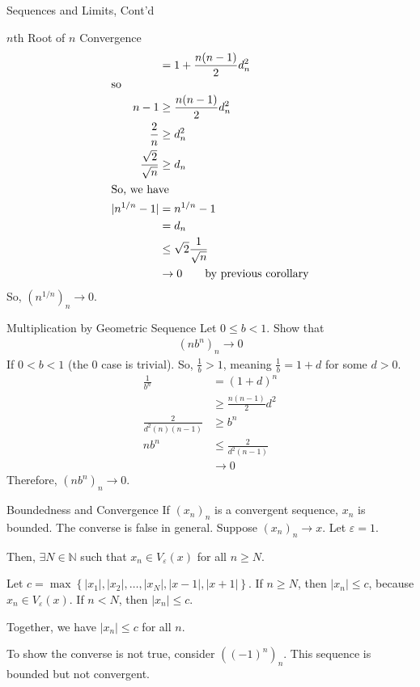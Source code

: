 \documentclass[8pt]{extarticle}
\newcommand{\N}{\mathbb{N}}
\begin{document}
\begin{problem}{Sequences and Limits, Cont'd}
\begin{problem}{$n$th Root of $n$ Convergence}
\begin{align*}
          &= 1 + \frac{n(n-1)}{2}d_n^2\\
          \shortintertext{so}
        n-1 &\geq \frac{n(n-1)}{2}d_n^2\\
        \frac{2}{n} &\geq d_n^2\\
        \frac{\sqrt{2}}{\sqrt{n}} &\geq d_n\\
        \shortintertext{So, we have}
        |n^{1/n} - 1| &= n^{1/n} - 1\\
                      &= d_n\\
                      &\leq \sqrt{2} \frac{1}{\sqrt{n}}\\
                      &\rightarrow 0 \tag*{by previous corollary}
      \end{align*}
      So, $\left(n^{1/n}\right)_n \rightarrow 0$.
    \end{problem}
    \begin{problem}{Multiplication by Geometric Sequence}
      Let $0 \leq b < 1$. Show that
      \begin{align*}
        \left(nb^n\right)_n \rightarrow 0
      \end{align*}
      \tcblower
      If $0 < b < 1$ (the $0$ case is trivial). So, $\frac{1}{b} > 1$, meaning $\frac{1}{b} = 1 + d$ for some $d > 0$.
      \begin{align*}
        \frac{1}{b^n} &= (1 + d)^n\\
                      &\geq \frac{n(n-1)}{2}d^2\\
        \frac{2}{d^2(n)(n-1)} &\geq b^n\\
        nb^n &\leq \frac{2}{d^2(n-1)}\\
             &\rightarrow 0 \tag*{by previous corollary}
      \end{align*}
      Therefore, $(nb^n)_n \rightarrow 0$.
    \end{problem}
  \end{problem}
  \begin{problem}{Boundedness and Convergence}
    If $\left(x_n\right)_n$ is a convergent sequence, $x_n$ is bounded. The converse is false in general.
    \tcblower
    Suppose $\left(x_n\right)_n \rightarrow x$. Let $\varepsilon = 1$.\newline

    Then, $\exists N\in\N$ such that $x_n\in V_{\varepsilon}(x)$ for all $n\geq N$.\newline

    Let $c = \max\left\{|x_1|,|x_2|,\dots,|x_N|,|x-1|,|x+1|\right\}$. If $n\geq N$, then $|x_n| \leq c$, because $x_n \in V_{\varepsilon}(x)$. If $n < N$, then $|x_n| \leq c$.\newline

    Together, we have $|x_n| \leq c$ for all $n$.\newline

    To show the converse is not true, consider $\left((-1)^n\right)_n$. This sequence is bounded but not convergent.
  \end{problem}
\end{document}
